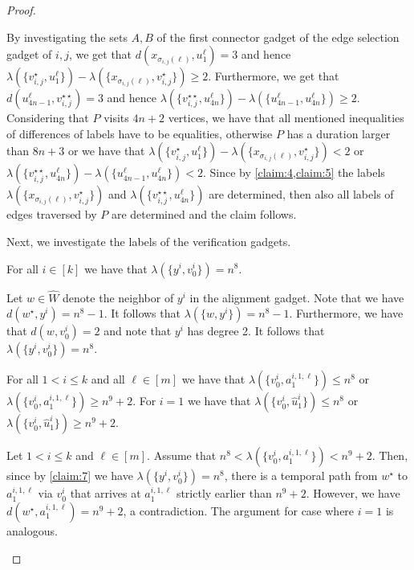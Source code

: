 \documentclass[a4paper,UKenglish,cleveref, autoref, thm-restate]{lipics-v2021}
\begin{document}
\begin{proof}
\begin{claimproof}
    By investigating the sets $A,B$ of the first connector gadget of the edge selection gadget of $i,j$, we get that $d(x_{\sigma_{i,j}(\ell)},u^\ell_{1})=3$ and hence $\lambda(\{v_{i,j}^\star,u^\ell_{1}\})-\lambda(\{x_{\sigma_{i,j}(\ell)},v_{i,j}^\star\})\ge 2$. Furthermore, we get that $d(u^\ell_{4n-1},v_{i,j}^{\star\star})=3$ and hence $\lambda(\{v_{i,j}^{\star\star},u^\ell_{4n}\})-\lambda(\{u^\ell_{4n-1},u^\ell_{4n}\})\ge 2$. Considering that $P$ visits $4n+2$ vertices, we have that all mentioned inequalities of differences of labels have to be equalities, otherwise $P$ has a duration larger than $8n+3$ or we have that $\lambda(\{v_{i,j}^\star,u^\ell_{1}\})-\lambda(\{x_{\sigma_{i,j}(\ell)},v_{i,j}^\star\})< 2$ or $\lambda(\{v_{i,j}^{\star\star},u^\ell_{4n}\})-\lambda(\{u^\ell_{4n-1},u^\ell_{4n}\})< 2$. Since by \cref{claim:4,claim:5} the labels $\lambda(\{x_{\sigma_{i,j}(\ell)},v_{i,j}^\star\})$ and $\lambda(\{v_{i,j}^{\star\star},u^\ell_{4n}\})$ are determined, then also all labels of edges traversed by $P$ are determined and the claim follows.
    \end{claimproof}

Next, we investigate the labels of the verification gadgets.

\begin{claim}\label{claim:7}
    For all $i\in[k]$ we have that $\lambda(\{y^i,v_0^i\})=n^8$.
\end{claim}
\begin{claimproof}
    Let $w\in \hat{W}$ denote the neighbor of $y^i$ in the alignment gadget. Note that we have $d(w^\star,y^i)=n^8-1$. It follows that $\lambda(\{w,y^i\})=n^8-1$. Furthermore, we have that $d(w,v_0^i)=2$ and note that $y^i$ has degree 2. It follows that $\lambda(\{y^i,v_0^i\})=n^8$.
\end{claimproof}

\begin{claim}\label{claim:8}
    For all $1<i\le k$ and all $\ell\in[m]$ we have that $\lambda(\{v_0^i,a^{i,1,\ell}_{1}\})\le n^8$ or $\lambda(\{v_0^i,a^{i,1,\ell}_{1}\})\ge n^9+2$.
    For $i=1$ we have that $\lambda(\{v_0^i,\hat{u}^i_1\})\le n^8$ or $\lambda(\{v_0^i,\hat{u}^i_1\})\ge n^9+2$.
\end{claim}
\begin{claimproof}
    Let $1<i\le k$ and $\ell\in[m]$. Assume that $n^8<\lambda(\{v_0^i,a^{i,1,\ell}_{1}\})< n^9+2$. Then, since by \cref{claim:7} we have $\lambda(\{y^i,v_0^i\})=n^8$, there is a temporal path from $w^\star$ to $a^{i,1,\ell}_{1}$ via $v_0^i$ that arrives at $a^{i,1,\ell}_{1}$ strictly earlier than $n^9+2$. However, we have $d(w^\star,a^{i,1,\ell}_{1})=n^9+2$, a contradiction. The argument for case where $i=1$ is analogous.
\end{claimproof}


\end{proof}
\end{document}
